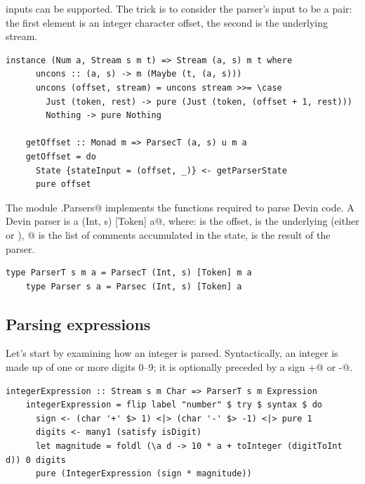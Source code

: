 \documentclass[UdineBachThesis,american,11pt]{PhdThesis}
\begin{document}
  \pagebreak

  inputs can be supported. The trick is to consider the parser's input to be a
  pair: the first element is an integer character offset, the second is the
  underlying stream.

  \begin{lstlisting}[gobble=4,basicstyle=\ttfamily\small]
    instance (Num a, Stream s m t) => Stream (a, s) m t where
      uncons :: (a, s) -> m (Maybe (t, (a, s)))
      uncons (offset, stream) = uncons stream >>= \case
        Just (token, rest) -> pure (Just (token, (offset + 1, rest)))
        Nothing -> pure Nothing

    getOffset :: Monad m => ParsecT (a, s) u m a
    getOffset = do
      State {stateInput = (offset, _)} <- getParserState
      pure offset
  \end{lstlisting}

  The module \lstinline@Devin.Parsers@ implements the functions required to
  parse Devin code. A Devin parser is a \lstinline@Parsec (Int, s) [Token] a@,
  where: \lstinline@Int@ is the offset, \lstinline@s@ is the underlying
  \lstinline@Steam@ (either \lstinline@String@ or \lstinline@Text@),
  \lstinline@[Token]@ is the list of comments accumulated in the state,
  \lstinline@a@ is the result of the parser.

  \begin{lstlisting}[gobble=4,basicstyle=\ttfamily\small]
    type ParserT s m a = ParsecT (Int, s) [Token] m a
    type Parser s a = Parsec (Int, s) [Token] a
  \end{lstlisting}

  \subsection{Parsing expressions}

  Let's start by examining how an integer is parsed. Syntactically, an integer
  is made up of one or more digits 0--9; it is optionally preceded by a sign
  \lstinline@+@ or \lstinline@-@.

  \begin{lstlisting}[gobble=4,basicstyle=\ttfamily\small]
    integerExpression :: Stream s m Char => ParserT s m Expression
    integerExpression = flip label "number" $ try $ syntax $ do
      sign <- (char '+' $> 1) <|> (char '-' $> -1) <|> pure 1
      digits <- many1 (satisfy isDigit)
      let magnitude = foldl (\a d -> 10 * a + toInteger (digitToInt d)) 0 digits
      pure (IntegerExpression (sign * magnitude))
  \end{lstlisting}
\end{document}
